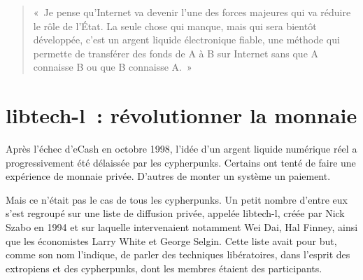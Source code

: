 \begin{quote}
«~Je pense qu'Internet va devenir l'une des forces majeures qui va réduire le rôle de l'État. La seule chose qui manque, mais qui sera bientôt développée, c'est un argent liquide électronique fiable, une méthode qui permette de transférer des fonds de A à B sur Internet sans que A connaisse B ou que B connaisse A.~»
\end{quote} %

\section*{libtech-l~: révolutionner la monnaie}

Après l'échec d'eCash en octobre 1998, l'idée d'un argent liquide numérique réel a progressivement été délaissée par les cypherpunks. Certains ont tenté de faire une expérience de monnaie privée. D'autres de monter un système un paiement.

Mais ce n'était pas le cas de tous les cypherpunks. Un petit nombre d'entre eux s'est regroupé sur une liste de diffusion privée, appelée libtech-l, créée par Nick Szabo en 1994 et sur laquelle intervenaient notamment Wei Dai, Hal Finney, ainsi que les économistes Larry White et George Selgin. Cette liste avait pour but, comme son nom l'indique, de parler des techniques libératoires, dans l'esprit des extropiens et des cypherpunks, dont les membres étaient des participants.

